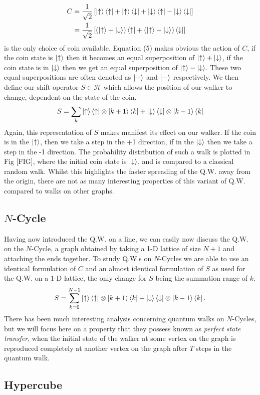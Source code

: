 \begin{align}
    C &= \frac{1}{\sqrt{2}}\left[
    \ket{\uparrow}\bra{\uparrow} +
    \ket{\uparrow}\bra{\downarrow} +
    \ket{\downarrow}\bra{\uparrow} -
    \ket{\downarrow}\bra{\downarrow}\right]\\
    &= \frac{1}{\sqrt{2}}\left[(\ket{\uparrow} + \ket{\downarrow})\bra{\uparrow} +
    (\ket{\uparrow} - \ket{\downarrow})\bra{\downarrow}\right]
\end{align}
is the only choice of coin available. 
Equation (5) makes obvious the action of $C$, if the coin state is $\ket{\uparrow}$ then it becomes an equal superposition of $\ket{\uparrow} + \ket{\downarrow}$, if the coin state is in $\ket{\downarrow}$ then we get an equal superposition of $\ket{\uparrow} - \ket{\downarrow}$. 
These two equal superpositions are often denoted as $\ket{+}$ and $\ket{-}$ respectively.\newline
We then define our shift operator $S \in \mathcal{H}$ which allows the position of our walker to change, dependent on the state of the coin.
\begin{equation}
    S = \sum_k \ket{\uparrow}\bra{\uparrow} \otimes \ket{k + 1}\bra{k} + \ket{\downarrow}\bra{\downarrow} \otimes \ket{k - 1}\bra{k}
\end{equation}
Again, this representation of $S$ makes manifest its effect on our walker. 
If the coin is in the $\ket{\uparrow}$, then we take a step in the +1 direction, if in the $\ket{\downarrow}$ then we take a step in the -1 direction. 
The probability distribution of such a walk is plotted in Fig [FIG], where the initial coin state is $\ket{\downarrow}$, and is compared to a classical random walk. Whilst this highlights the faster spreading of the Q.W. away from the origin, there are not as many interesting properties of this variant of Q.W. compared to walks on other graphs.
\subsection{\texorpdfstring{$N$}{N}-Cycle}
Having now introduced the Q.W. on a line, we can easily now discuss the Q.W. on the $N$-Cycle, a graph obtained by taking a 1-D lattice of size $N + 1$ and attaching the ends together. To study Q.W.s on $N$-Cycles we are able to use an identical formulation of $C$ and an almost identical formulation of $S$ as used for the Q.W. on a 1-D lattice, the only change for $S$ being the summation range of $k$.
\begin{equation}
    S = \sum_{k=0}^{N - 1}\ket{\uparrow}\bra{\uparrow} \otimes \ket{k + 1}\bra{k} + \ket{\downarrow}\bra{\downarrow} \otimes \ket{k - 1}\bra{k}.
\end{equation}
There has been much interesting analysis concerning quantum walks on $N$-Cycles, but we will focus here on a property that they possess known as \emph{perfect state transfer}, when the initial state of the walker at some vertex on the graph is reproduced completely  at another vertex on the graph after $T$ steps in the quantum walk.



\subsection{Hypercube}
\lipsum[1]